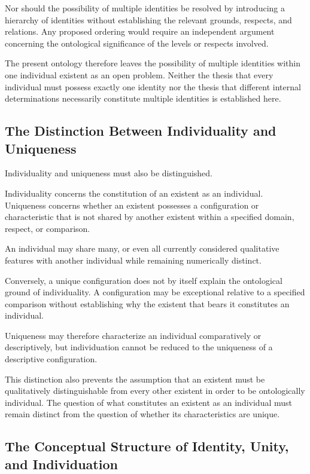 Nor should the possibility of multiple identities be
resolved by introducing a hierarchy of identities without
establishing the relevant grounds, respects, and relations.
Any proposed ordering would require an independent
argument concerning the ontological significance of
the levels or respects involved.

The present ontology therefore leaves the possibility
of multiple identities within one individual existent
as an open problem. Neither the thesis that every
individual must possess exactly one identity nor the
thesis that different internal determinations necessarily
constitute multiple identities is established here.

\subsection{The Distinction Between Individuality and Uniqueness}

Individuality and uniqueness must also be distinguished.

Individuality concerns the constitution of an existent
as an individual. Uniqueness concerns whether an existent
possesses a configuration or characteristic that is
not shared by another existent within a specified
domain, respect, or comparison.

An individual may share many, or even all currently
considered qualitative features with another individual
while remaining numerically distinct.

Conversely, a unique configuration does not by itself
explain the ontological ground of individuality. A
configuration may be exceptional relative to a specified
comparison without establishing why the existent that
bears it constitutes an individual.

Uniqueness may therefore characterize an individual
comparatively or descriptively, but individuation cannot
be reduced to the uniqueness of a descriptive configuration.

This distinction also prevents the assumption that an
existent must be qualitatively distinguishable from every
other existent in order to be ontologically individual.
The question of what constitutes an existent as an
individual must remain distinct from the question of
whether its characteristics are unique.

\subsection{The Conceptual Structure of Identity, Unity, and Individuation}

